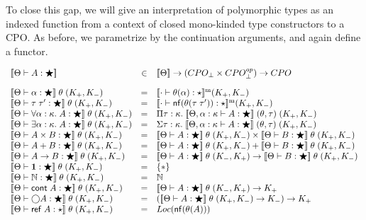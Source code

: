 To close this gap, we will give an interpretation of polymorphic types
as an indexed function from a context of closed mono-kinded type
constructors to a CPO.  As before, we parametrize by the
continuation arguments, and again define a functor.

\begin{displaymath}
\begin{array}{lcl}\interp{\judgeWK{A}{\bigstar}} &\in& \interp{\Theta} \to (CPO_\bot \times CPO^{op}_\bot) \to CPO 
\\[1em]
\interp{\judgeWK{\alpha}{\bigstar}}\;\theta\;(K_+,K_-) & = & 
    \interpmono{\judgeWK[\cdot]{\theta(\alpha)}{\star}}(K_+, K_-) 
\\
\interp{\judgeWK{\tau\;\tau'}{\bigstar}}\;\theta\;(K_+,K_-) & = & 
    \interpmono{\judgeWK[\cdot]{\normalize{\theta(\tau\;\tau')}}{\star}}(K_+, K_-) 
\\
\interp{\judgeWK{\forall \alpha:\kappa.\;A}{\bigstar}}\;\theta\;(K_+,K_-) & = & 
    \Pi \tau:\kappa.\; 
        \interp{\judgeWK[\Theta, \alpha:\kappa]{A}{\bigstar}}\;(\theta,\tau)\;(K_+,K_-) 
\\
\interp{\judgeWK{\exists \alpha:\kappa.\;A}{\bigstar}}\;\theta\;(K_+,K_-) & = & 
    \Sigma \tau:\kappa.\; 
        \interp{\judgeWK[\Theta, \alpha:\kappa]{A}{\bigstar}}\;(\theta,\tau)\;(K_+,K_-) 
\\
\interp{\judgeWK{A \times B}{\bigstar}}\;\theta\;(K_+,K_-) & = & 
   \interp{\judgeWK{A}{\bigstar}}\;\theta\;(K_+,K_-) \times
   \interp{\judgeWK{B}{\bigstar}}\;\theta\;(K_+,K_-) 
\\
\interp{\judgeWK{A + B}{\bigstar}}\;\theta\;(K_+,K_-) & = & 
   \interp{\judgeWK{A}{\bigstar}}\;\theta\;(K_+,K_-) +
   \interp{\judgeWK{B}{\bigstar}}\;\theta\;(K_+,K_-) 
\\
\interp{\judgeWK{A \to B}{\bigstar}}\;\theta\;(K_+,K_-) & = & 
   \interp{\judgeWK{A}{\bigstar}}\;\theta\;(K_-,K_+) \to
   \interp{\judgeWK{B}{\bigstar}}\;\theta\;(K_+,K_-) 
\\
\interp{\judgeWK{\unittype}{\bigstar}}\;\theta\;(K_+, K_-) & = & \setof{*} 
\\

\interp{\judgeWK{\N}{\bigstar}}\;\theta\;(K_+, K_-) & = &  \N 
\\
\interp{\judgeWK{\cont{A}}{\bigstar}}\;\theta\;(K_+,K_-) & = & 
   \interp{\judgeWK{A}{\bigstar}}\;\theta\;(K_-,K_+) \to K_+
\\
\interp{\judgeWK{\monad{A}}{\bigstar}}\;\theta\;(K_+,K_-) & = & 
   (\interp{\judgeWK{A}{\bigstar}}\;\theta\;(K_+,K_-) \to K_-) \to K_+
\\
\interp{\judgeWK{\reftype{A}}{\star}}\;\theta\;(K_+, K_-) & = & Loc(\normalize{\theta(A)}) 
\\
\end{array}
\end{displaymath}

